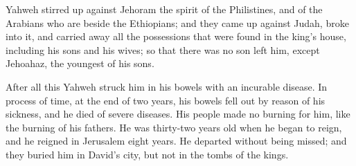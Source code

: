 {\par }{\PP {}Yahweh stirred up against Jehoram the spirit of the Philistines, and of the Arabians who are beside the Ethiopians;
and they came up against Judah, broke into it, and carried away all the possessions that were found in the king’s house, including his sons and his wives; so that there was no son left him, except Jehoahaz, the youngest of his sons.
\par }{\PP {}After all this Yahweh struck him in his bowels with an incurable disease.
In process of time, at the end of two years, his bowels fell out by reason of his sickness, and he died of severe diseases. His people made no burning for him, like the burning of his fathers.
He was thirty-two years old when he began to reign, and he reigned in Jerusalem eight years. He departed without being missed; and they buried him in David’s city, but not in the tombs of the kings.

}
